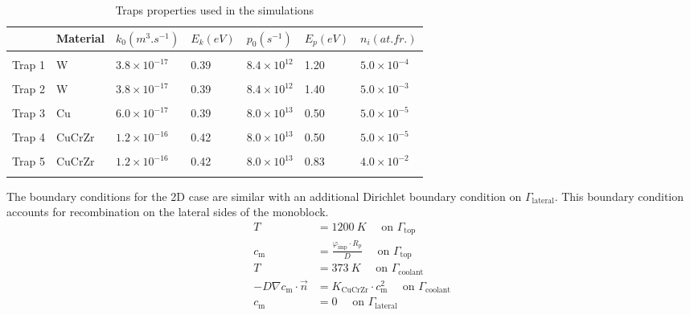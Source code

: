 \begin{table}
    \centering
    \begin{tabular}{L{1.5cm} L{1.5cm} R{1.6cm} R{1.1cm} R{1.6cm} R{1.1cm} R{2cm}}
         & Material & $k_0 (\si{m^3.s^{-1}})$ &  $E_k (\si{eV})$ & $p_0 (\si{s^{-1}})$ & $E_p (\si{eV})$ & $n_i (\si{at.fr.})$ \\
        \hline
        \\
        Trap 1 & W & $3.8 \times 10^{-17}$ & 0.39 & $8.4 \times 10^{12}$& 1.20 & $5.0 \times 10^{-4}$ \\
        \\
       Trap 2 & W & $3.8 \times 10^{-17}$ & 0.39 & $8.4 \times 10^{12}$& 1.40 & $5.0 \times 10^{-3}$ \\
        \\
        Trap 3 & Cu & $6.0 \times 10^{-17}$ & 0.39 & $8.0 \times 10^{13}$ & 0.50 &$5.0 \times 10^{-5}$\\
        \\
        Trap 4 & CuCrZr & $1.2\times 10^{-16}$ & 0.42 & $8.0 \times 10^{13}$ & 0.50 &$5.0 \times 10^{-5}$\\
        \\
        Trap 5 & CuCrZr & $1.2\times 10^{-16}$ & 0.42 & $8.0 \times 10^{13}$ & 0.83 &$4.0 \times 10^{-2}$\\
        \\
    \end{tabular}
    \caption{Traps properties used in the simulations \cite{hodille_macroscopic_2015, dolan_assessment_1994}}
    \label{tab:traps monoblock_1}
\end{table}

The boundary conditions for the 2D case are similar with an additional Dirichlet boundary condition on $\Gamma_\mathrm{lateral}$.
This boundary condition accounts for recombination on the lateral sides of the monoblock.
\begin{subequations}
    \begin{align}
        T &=  \SI{1200}{K}\quad \text { on } \Gamma_\mathrm{top}\\
        c_\mathrm{m} &=  \frac{\varphi_\mathrm{imp} \cdot R_p}{D}\quad \text { on } \Gamma_\mathrm{top}\\
        T &= \SI{373}{K}\quad \text { on } \Gamma_\mathrm{coolant}\\
        -D \nabla c_\mathrm{m} \cdot \vec{n} &= K_\mathrm{CuCrZr} \cdot c_\mathrm{m}^{2} \quad \text { on } \Gamma_\mathrm{coolant} \\
        c_\mathrm{m} &= 0 \quad \text { on } \Gamma_\mathrm{lateral}
    \end{align}
\end{subequations}

